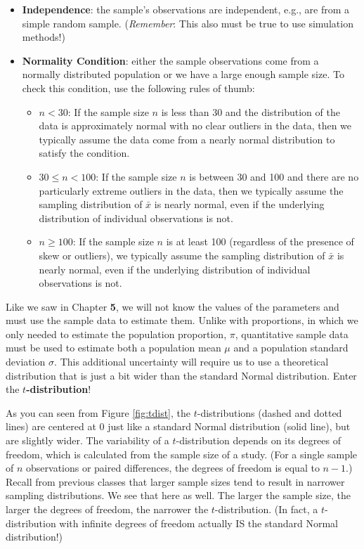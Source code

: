 \documentclass[
]{report}
\begin{document}
\begin{itemize}
\item
  \textbf{Independence}: the sample's observations are independent, e.g., are from a simple random sample. (\emph{Remember}: This also must be true to use simulation methods!)
\item
  \textbf{Normality Condition}: either the sample observations come from a normally distributed population or we have a large enough sample size. To check this condition, use the following rules of thumb:

  \begin{itemize}
  \item
    \(n < 30\): If the sample size \(n\) is less than 30 and the distribution of the data is approximately normal with no clear outliers in the data, then we typically assume the data come from a nearly normal distribution to satisfy the condition.
  \item
    \(30 \leq n < 100\): If the sample size \(n\) is between 30 and 100 and there are no particularly extreme outliers in the data, then we typically assume the sampling distribution of \(\bar{x}\) is nearly normal, even if the underlying distribution of individual observations is not.
  \item
    \(n \geq 100\): If the sample size \(n\) is at least 100 (regardless of the presence of skew or outliers), we typically assume the sampling distribution of \(\bar{x}\) is nearly normal, even if the underlying distribution of individual observations is not.
  \end{itemize}
\end{itemize}

Like we saw in Chapter \textbf{5}, we will not know the values of the parameters and must use the sample data to estimate them. Unlike with proportions, in which we only needed to estimate the population proportion, \(\pi\), quantitative sample data must be used to estimate both a population mean \(\mu\) and a population standard deviation \(\sigma\). This additional uncertainty will require us to use a theoretical distribution that is just a bit wider than the standard Normal distribution. Enter the \textbf{\(t\)-distribution}!

As you can seen from Figure \ref{fig:tdist}, the \(t\)-distributions (dashed and dotted lines) are centered at 0 just like a standard Normal distribution (solid line), but are slightly wider. The variability of a \(t\)-distribution depends on its degrees of freedom, which is calculated from the sample size of a study. (For a single sample of \(n\) observations or paired differences, the degrees of freedom is equal to \(n-1\).) Recall from previous classes that larger sample sizes tend to result in narrower sampling distributions. We see that here as well. The larger the sample size, the larger the degrees of freedom, the narrower the \(t\)-distribution. (In fact, a \(t\)-distribution with infinite degrees of freedom actually IS the standard Normal distribution!)
\end{document}
